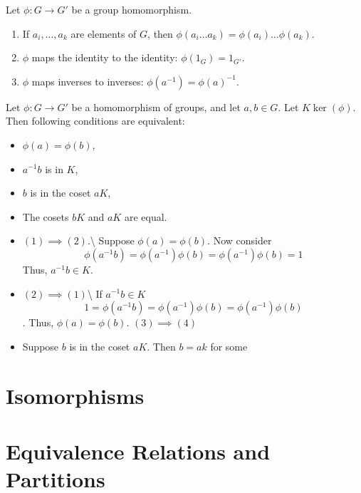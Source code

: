 \documentclass[
]{book}
\providecommand{\tightlist}{%
  \setlength{\itemsep}{0pt}\setlength{\parskip}{0pt}}
\begin{document}
\leavevmode{}%
Let \(\phi: G \rightarrow G'\) be a group homomorphism.

\begin{enumerate}
\def\labelenumi{(\alph{enumi})}
\item
  If \(a_i, \ldots, a_k\) are elements of \(G\), then
  \(\phi(a_i \ldots a_k) = \phi(a_i) \ldots \phi(a_k)\).
\item
  \(\phi\) maps the identity to the identity: \(\phi(1_G) = 1_{G'}\).
\item
  \(\phi\) maps inverses to inverses: \(\phi(a^{-1}) = \phi(a)^{-1}\).
\end{enumerate}

\leavevmode{}%
Let \(\phi : G \rightarrow G'\) be a homomorphism of groups, and let
\(a,b\in G\). Let \(K\ker(\phi)\). Then following conditions are
equivalent:

\begin{itemize}
\tightlist
\item
  \(\phi(a) = \phi(b)\),\\
\item
  \(a^{-1}b\) is in \(K\),
\item
  \(b\) is in the coset \(aK\),
\item
  The cosets \(bK\) and \(aK\) are equal.
\end{itemize}

\begin{itemize}
\tightlist
\item
  \((1)\implies (2)\).\textbackslash{} Suppose \(\phi(a) = \phi(b)\).
  Now consider
  \[\phi(a^{-1}b)=\phi(a^{-1})\phi(b)=\phi(a^{-1} )\phi(b)=1\] Thus,
  \(a^{-1}b\in K\).
\item
  \((2)\implies (1)\)\textbackslash{} If \(a^{-1}b \in K\)
  \[1=\phi(a^{-1}b)=\phi(a^{-1})\phi(b)=\phi(a^{-1} )\phi(b)\]. Thus,
  \(\phi(a)=\phi(b)\). \((3) \implies (4)\)
\item
  Suppose \(b\) is in the coset \(aK\). Then \(b=ak\) for some
\end{itemize}

\hypertarget{isomorphisms}{%
\section{Isomorphisms}\label{isomorphisms}}

\hypertarget{equivalence-relations-and-partitions}{%
\section{Equivalence Relations and
Partitions}\label{equivalence-relations-and-partitions}}
\end{document}
